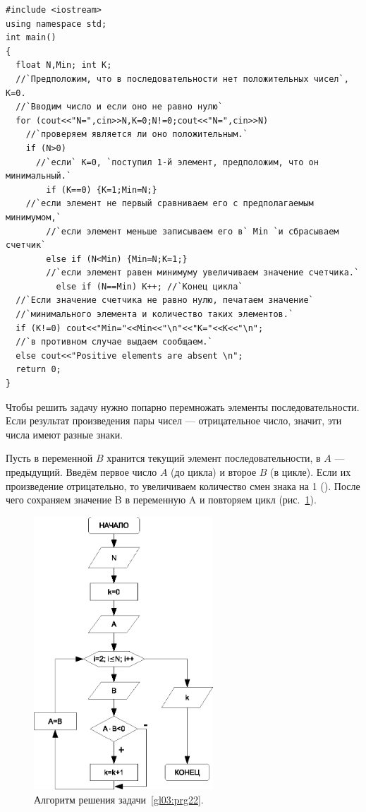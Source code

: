 \begin{lstlisting}
#include <iostream>
using namespace std;
int main()
{
  float N,Min; int K;
  //`Предположим, что в последовательности нет положительных чисел`, K=0.
  //`Вводим число и если оно не равно нулю`
  for (cout<<"N=",cin>>N,K=0;N!=0;cout<<"N=",cin>>N)
    //`проверяем является ли оно положительным.`
    if (N>0)
      //`если` K=0, `поступил 1-й элемент, предположим, что он минимальный.`
        if (K==0) {K=1;Min=N;}
	//`если элемент не первый сравниваем его с предполагаемым минимумом,`
        //`если элемент меньше записываем его в` Min `и сбрасываем счетчик`
        else if (N<Min) {Min=N;K=1;}
        //`если элемент равен минимуму увеличиваем значение счетчика.`
          else if (N==Min) K++; //`Конец цикла`
  //`Если значение счетчика не равно нулю, печатаем значение`
  //`минимального элемента и количество таких элементов.`
  if (K!=0) cout<<"Min="<<Min<<"\n"<<"K="<<K<<"\n";
  //`в противном случае выдаем сообщаем.`
  else cout<<"Positive elements are absent \n";
  return 0;
}
\end{lstlisting}



Чтобы решить задачу нужно попарно перемножать элементы последовательности. Если результат произведения пары чисел ---
отрицательное число, значит, эти числа имеют разные знаки. 

Пусть в переменной $B$ хранится текущий элемент последовательности, в $A$ --- предыдущий. Введём первое 
число $A$ (до цикла) и
второе $B$ (в цикле). Если их произведение отрицательно, то увеличиваем количество смен знака на 1 (). После чего
сохраняем значение B в переменную A и повторяем цикл (рис.~\ref{ch03:refDrawing35}).

\begin{figure}[htb]
\begin{center}
\includegraphics[width=0.6\textwidth]{img/ris_3_36}
\caption{Алгоритм решения задачи~\ref{gl03:prg22}.}
\label{ch03:refDrawing35}
\end{center}
\end{figure}

